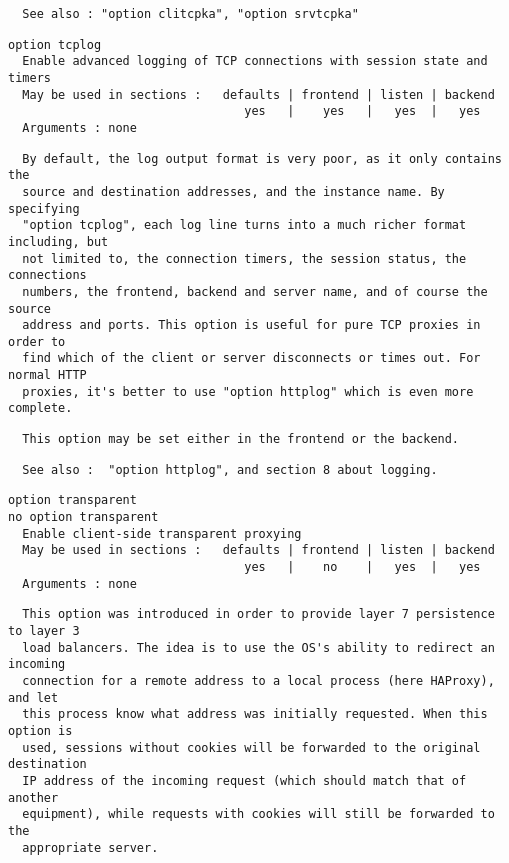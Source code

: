 \begin{verbatim}
  See also : "option clitcpka", "option srvtcpka"
\end{verbatim}

\begin{verbatim}
option tcplog
  Enable advanced logging of TCP connections with session state and timers
  May be used in sections :   defaults | frontend | listen | backend
                                 yes   |    yes   |   yes  |   yes
  Arguments : none
\end{verbatim}

\begin{verbatim}
  By default, the log output format is very poor, as it only contains the
  source and destination addresses, and the instance name. By specifying
  "option tcplog", each log line turns into a much richer format including, but
  not limited to, the connection timers, the session status, the connections
  numbers, the frontend, backend and server name, and of course the source
  address and ports. This option is useful for pure TCP proxies in order to
  find which of the client or server disconnects or times out. For normal HTTP
  proxies, it's better to use "option httplog" which is even more complete.
\end{verbatim}

\begin{verbatim}
  This option may be set either in the frontend or the backend.
\end{verbatim}

\begin{verbatim}
  See also :  "option httplog", and section 8 about logging.
\end{verbatim}

\begin{verbatim}
option transparent
no option transparent
  Enable client-side transparent proxying
  May be used in sections :   defaults | frontend | listen | backend
                                 yes   |    no    |   yes  |   yes
  Arguments : none
\end{verbatim}

\begin{verbatim}
  This option was introduced in order to provide layer 7 persistence to layer 3
  load balancers. The idea is to use the OS's ability to redirect an incoming
  connection for a remote address to a local process (here HAProxy), and let
  this process know what address was initially requested. When this option is
  used, sessions without cookies will be forwarded to the original destination
  IP address of the incoming request (which should match that of another
  equipment), while requests with cookies will still be forwarded to the
  appropriate server.
\end{verbatim}


